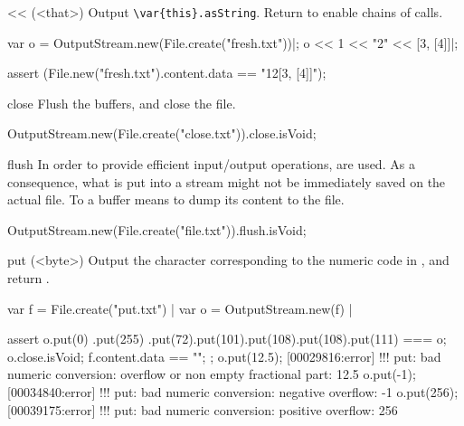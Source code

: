 \begin{urbiscriptapi}
\item[<<](<that>)%
  Output \lstinline|\var{this}.asString|.  Return \this to
  enable chains of calls.
\begin{urbiscript}
var o = OutputStream.new(File.create("fresh.txt"))|;
o << 1 << "2" << [3, [4]]|;

assert (File.new("fresh.txt").content.data == "12[3, [4]]");
\end{urbiscript}

\item[close]
  Flush the buffers, and close the file.
\begin{urbiassert}
OutputStream.new(File.create("close.txt")).close.isVoid;
\end{urbiassert}

\item[flush]%
  In order to provide efficient input/output operations,
   are used.  As a consequence, what is put into a
  stream might not be immediately saved on the actual file.  To 
  a buffer means to dump its content to the file.
\begin{urbiassert}
OutputStream.new(File.create("file.txt")).flush.isVoid;
\end{urbiassert}

\item[put](<byte>)%
  Output the character corresponding to the numeric code  in
  \this, and return \this.
\begin{urbiscript}[firstnumber=1]
var f = File.create("put.txt") |
var o = OutputStream.new(f) |

assert
{
  o.put(0)
   .put(255)
   .put(72).put(101).put(108).put(108).put(111)
  === o;
  o.close.isVoid;
  f.content.data == "\0\xffHello";
};
o.put(12.5);
[00029816:error] !!! put: bad numeric conversion: overflow or non empty fractional part: 12.5
o.put(-1);
[00034840:error] !!! put: bad numeric conversion: negative overflow: -1
o.put(256);
[00039175:error] !!! put: bad numeric conversion: positive overflow: 256
\end{urbiscript}

\end{urbiscriptapi}



